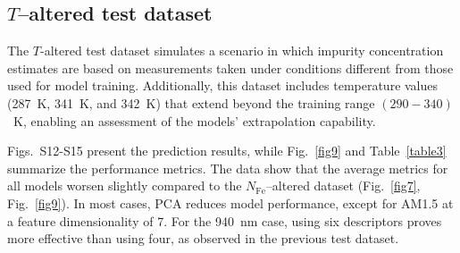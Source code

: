 \documentclass[a4paper,fleqn,draft]{cas-sc}
\begin{document}
\subsection{$T$--altered test dataset}

The $T$-altered test dataset simulates a scenario in which impurity concentration estimates
are based on measurements taken under conditions different from those used for model training.
Additionally, this dataset includes temperature values (287~K, 341~K, and 342~K)
that extend beyond the training range $(290-340)$~K, enabling an assessment of the models' extrapolation capability.

Figs.~S12-S15 present the prediction results, while Fig.~\ref{fig9} and Table~\ref{table3} summarize the performance metrics.
The data show that the average metrics for all models worsen slightly compared
to the $N_\mathrm{Fe}$--altered dataset (Fig.~\ref{fig7}, Fig.~\ref{fig9}).
In most cases, PCA reduces model performance, except for AM1.5 at a feature dimensionality of 7.
For the 940~nm case, using six descriptors proves more effective than using four, as observed in the previous test dataset.
\end{document}
